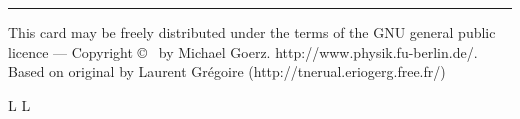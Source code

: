 \vfill \hrule\smallskip
{\smallrm This card may be freely distributed under
the terms of the GNU general public licence ---
Copyright \copyright\ {} by Michael Goerz. 
{\smalltt http://www.physik.fu-berlin.de/}. Based on original by 
Laurent Gr\'egoire  ({\smalltt http://tnerual.eriogerg.free.fr/})}

\supereject
\if L\lr \else\null\vfill\eject\fi
\if L\lr \else\null\vfill\eject\fi
\bye

